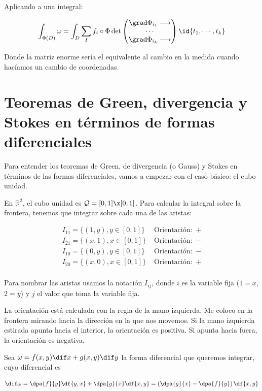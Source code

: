 Aplicando a una integral:

\begin{equation}
\int_{\Phi(D)} \omega = \int_D \sum_I f_i\circ\Phi 
\det \begin{pmatrix}
	\grad \Phi_{i_1} \longrightarrow \\
	\cdots\\
	\grad \Phi_{i_k} \longrightarrow 
\end{pmatrix}\id{t_1,\dotsb,t_k}
\label{eqPbIntFDif}
\end{equation}

Donde la matriz enorme sería el equivalente al cambio en la medida cuando hacíamos un cambio de coordenadas.

\section{Teoremas de Green, divergencia y Stokes en términos de formas diferenciales}
Para entender los teoremas de Green, de divergencia (o Gauss) y Stokes en términos de las formas diferenciales, vamos a empezar con el caso básico: el cubo unidad.

En $ℝ^2$, el cubo unidad es $\mathcal{Q} = [0,1]\x[0,1]$. Para calcular la integral sobre la frontera, tenemos que integrar sobre cada una de las aristas:

\[\begin{array}{cc}
I_{11} =\{(1,y),y\in[0,1]\}&\text{ Orientación: }\, +\\
I_{21} =\{(x,1),x\in[0,1]\}&\text{ Orientación: }\, -\\
I_{10} =\{(0,y),y\in[0,1]\}&\text{ Orientación: }\, -\\
I_{20} =\{(x,0),x\in[0,1]\}&\text{ Orientación: }\, +\\
\end{array}
\]

Para nombrar las aristas usamos la notación $I_{ij}$, donde $i$ es la variable fija ($1=x$,$2=y$) y $j$ el valor que toma la variable fija.

La orientación está calculada con la regla de la mano izquierda. Me coloco en la frontera mirando hacia la dirección en la que nos movemos. Si la mano izquierda estirada apunta hacia el interior, la orientación es positiva. Si apunta hacia fuera, la orientación es negativa.

Sea $\omega = f(x,y)\dif x + g(x,y)\dif y$ la forma diferencial que queremos integrar, cuyo diferencial es

\[\dif \omega= \dpa{f}{y}\df{y,x} + \dpa{g}{x}\df{x,y} = \left(\dpa{g}{x} - \dpa{f}{y}\right) \df{x,y}\]

